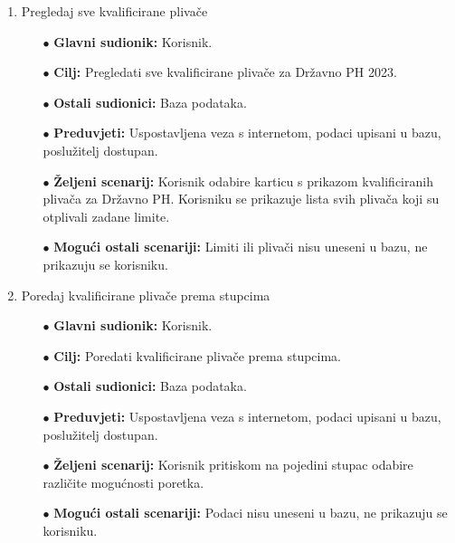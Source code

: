 \documentclass[times, utf8, zavrsni]{fer}
\begin{document}
\begin{enumerate}
    \item Pregledaj sve kvalificirane plivače
    \begin{itemize}
        \item[$\bullet$] \textbf{Glavni sudionik:} Korisnik.
        \item[$\bullet$] \textbf{Cilj:} Pregledati sve kvalificirane plivače za Državno PH 2023.
        \item[$\bullet$] \textbf{Ostali sudionici:} Baza podataka.
        \item[$\bullet$] \textbf{Preduvjeti:} Uspostavljena veza s internetom, podaci upisani u bazu, poslužitelj dostupan.
        \item[$\bullet$] \textbf{Željeni scenarij:} Korisnik odabire karticu s prikazom kvalificiranih plivača za Državno PH. Korisniku se prikazuje
        lista svih plivača koji su otplivali zadane limite.
        \item[$\bullet$] \textbf{Mogući ostali scenariji:} Limiti ili plivači nisu uneseni u bazu, ne prikazuju se korisniku.
    \end{itemize}


    \item Poredaj kvalificirane plivače prema stupcima
    \begin{itemize}
        \item[$\bullet$] \textbf{Glavni sudionik:} Korisnik.
        \item[$\bullet$] \textbf{Cilj:} Poredati kvalificirane plivače prema stupcima.
        \item[$\bullet$] \textbf{Ostali sudionici:} Baza podataka.
        \item[$\bullet$] \textbf{Preduvjeti:} Uspostavljena veza s internetom, podaci upisani u bazu, poslužitelj dostupan.
        \item[$\bullet$] \textbf{Željeni scenarij:} Korisnik pritiskom na pojedini stupac odabire različite mogućnosti poretka.
        \item[$\bullet$] \textbf{Mogući ostali scenariji:} Podaci nisu uneseni u bazu, ne prikazuju se korisniku.
    \end{itemize}



\end{enumerate}
\end{document}
